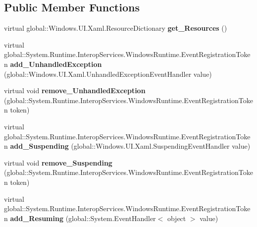 \subsection*{Public Member Functions}
\begin{DoxyCompactItemize}
\item 
\mbox{\label{class_windows_1_1_u_i_1_1_xaml_1_1_application_a34b9be50f5ce3d03d0f641d57ed74c72}} 
virtual global\+::\+Windows.\+U\+I.\+Xaml.\+Resource\+Dictionary {\bfseries get\+\_\+\+Resources} ()
\item 
\mbox{\label{class_windows_1_1_u_i_1_1_xaml_1_1_application_a3fdd0d36fb6e5880c92fd8b205ab9cda}} 
virtual global\+::\+System.\+Runtime.\+Interop\+Services.\+Windows\+Runtime.\+Event\+Registration\+Token {\bfseries add\+\_\+\+Unhandled\+Exception} (global\+::\+Windows.\+U\+I.\+Xaml.\+Unhandled\+Exception\+Event\+Handler value)
\item 
\mbox{\label{class_windows_1_1_u_i_1_1_xaml_1_1_application_ab4bbcd1b2fae8d35eae530ebe85732ba}} 
virtual void {\bfseries remove\+\_\+\+Unhandled\+Exception} (global\+::\+System.\+Runtime.\+Interop\+Services.\+Windows\+Runtime.\+Event\+Registration\+Token token)
\item 
\mbox{\label{class_windows_1_1_u_i_1_1_xaml_1_1_application_ac22db715c72a7c090a65a2657417c4e6}} 
virtual global\+::\+System.\+Runtime.\+Interop\+Services.\+Windows\+Runtime.\+Event\+Registration\+Token {\bfseries add\+\_\+\+Suspending} (global\+::\+Windows.\+U\+I.\+Xaml.\+Suspending\+Event\+Handler value)
\item 
\mbox{\label{class_windows_1_1_u_i_1_1_xaml_1_1_application_a697beee9101ae37839824e38fb697688}} 
virtual void {\bfseries remove\+\_\+\+Suspending} (global\+::\+System.\+Runtime.\+Interop\+Services.\+Windows\+Runtime.\+Event\+Registration\+Token token)
\item 
\mbox{\label{class_windows_1_1_u_i_1_1_xaml_1_1_application_aebc7735fefc7c00f75274d1e1dad4cc1}} 
virtual global\+::\+System.\+Runtime.\+Interop\+Services.\+Windows\+Runtime.\+Event\+Registration\+Token {\bfseries add\+\_\+\+Resuming} (global\+::\+System.\+Event\+Handler$<$ object $>$ value)

\end{DoxyCompactItemize}
